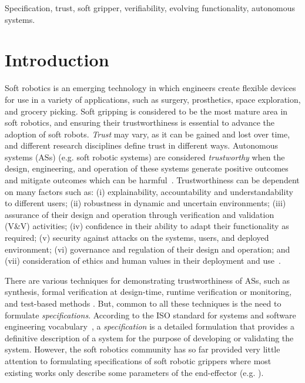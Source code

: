 \documentclass[lettersize,journal]{IEEEtran}
\begin{document}
\begin{IEEEkeywords}
	Specification, trust, soft gripper, verifiability, evolving functionality, autonomous systems.
\end{IEEEkeywords}

\section{Introduction}\label{introduction}
Soft robotics is an emerging technology in which engineers create flexible devices for use in a variety of applications, such as surgery, prosthetics, space exploration, and grocery picking. 
Soft gripping is considered to be the most mature area in soft robotics, and ensuring their trustworthiness is essential to advance the adoption of soft robots. 
\emph{Trust} may vary, as it can be gained and lost over time, and different research disciplines define trust in different ways. 
Autonomous systems (ASs) (e.g. soft robotic systems) are considered \emph{trustworthy} when the design, engineering, and operation of these systems generate positive outcomes and mitigate outcomes which can be harmful~\cite{Naiseh2022}.
Trustworthiness can be dependent on many factors such as: (i) explainability, accountability and understandability to different users; (ii) robustness in dynamic and uncertain environments; (iii) assurance of their design and operation through verification and validation (V\&V) activities; (iv) confidence in their ability to adapt their functionality as required; (v) security against attacks on the systems, users, and deployed environment; (vi) governance and regulation of their design and operation; and (vii) consideration of ethics and human values in their deployment and use~\cite{Naiseh2022}. 

There are various techniques for demonstrating trustworthiness of ASs, such as synthesis, formal verification at design-time, runtime verification or monitoring, and test-based methods \cite{Abeywickrama2022}. 
But, common to all these techniques is the need to formulate \emph{specifications}. 	
According to the ISO standard for systems and software engineering vocabulary~\cite{ISO24765:2017}, a \emph{specification} is a detailed formulation that provides a definitive description of a system for the purpose of developing or validating the system. 
However, the soft robotics community has so far provided very little attention to formulating specifications of soft robotic grippers where most existing works only describe some parameters of the end-effector (e.g. \cite{Hong2022,Bhattacharya2019,Tadakuma2020,Loh2014,Nishikawa2019,Mohan2020}).  
\end{document}
